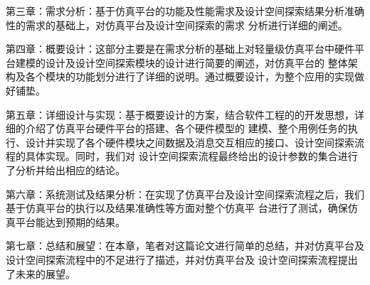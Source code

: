 第三章：需求分析：基于仿真平台的功能及性能需求及设计空间探索结果分析准确性的需求的基础上，对仿真平台及设计空间探索的需求
分析进行详细的阐述。

第四章：概要设计：这部分主要是在需求分析的基础上对轻量级仿真平台中硬件平台建模的设计及设计空间探索模块的设计进行简要的阐述，对仿真平台的
整体架构及各个模块的功能划分进行了详细的说明。通过概要设计，为整个应用的实现做好铺垫。

第五章：详细设计与实现：基于概要设计的方案，结合软件工程的的开发思想，详细的介绍了仿真平台硬件平台的搭建、各个硬件模型的
建模、整个用例任务的执行、设计并实现了各个硬件模块之间数据及消息交互相应的接口、设计空间探索流程的具体实现。同时，我们对
设计空间探索流程最终给出的设计参数的集合进行了分析并给出相应的结论。

第六章：系统测试及结果分析：在实现了仿真平台及设计空间探索流程之后，我们基于仿真平台的执行以及结果准确性等方面对整个仿真平
台进行了测试，确保仿真平台能达到预期的结果。

第七章：总结和展望：在本章，笔者对这篇论文进行简单的总结，并对仿真平台及设计空间探索流程中的不足进行了描述，并对仿真平台及
设计空间探索流程提出了未来的展望。

